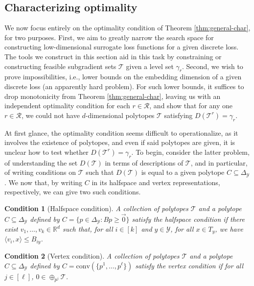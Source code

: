 \documentclass[anon]{colt2020} %
\newcommand{\reals}{\mathbb{R}}
\newcommand{\simplex}{\Delta_\Y}
\newcommand{\R}{\mathcal{R}}
\newcommand{\T}{\mathcal{T}}
\newcommand{\Y}{\mathcal{Y}}
\newcommand{\inprod}[2]{\langle #1, #2 \rangle}%
\newcommand{\conv}{\mathrm{conv}}
\newtheorem{condition}{Condition}
\begin{document}
\subsection{Characterizing optimality}\label{subsec:opt-conditions}

We now focus entirely on the optimality condition of Theorem \ref{thm:general-char}, for two purposes.
First, we aim to greatly narrow the search space for constructing low-dimensional surrogate loss functions for a given discrete loss.
The tools we construct in this section aid in this task by constraining or constructing feasible subgradient sets $\T$ given a level set $\gamma_r$.
Second, we wish to prove impossibilities, i.e., lower bounds on the embedding dimension of a given discrete loss (an apparently hard problem).
For such lower bounds, it suffices to drop monotonicity from Theorem \ref{thm:general-char}, leaving us with an independent optimality condition for each $r\in\R$, and show that for any one $r\in\R$, we could not have $d$-dimensional polytopes $\T$ satisfying $D(\T^r) = \gamma_r$.

At first glance, the optimality condition seems difficult to operationalize, as it involves the existence of polytopes, and even if said polytopes are given, it is unclear how to test whether $D(\T^r)=\gamma_r$.
To begin, consider the latter problem, of understanding the set $D(\T)$ in terms of descriptions of $\T$, and in particular, of writing conditions on $\T$ such that $D(\T)$ is equal to a given polytope $C\subseteq\simplex$.
We now that, by writing $C$ in its halfspace and vertex representations, respectively, we can give two such conditions.

\begin{condition}[Halfspace condition]\label{cond:H-condition}
	A collection of polytopes $\T$ and a polytope $C\subseteq\simplex$ defined by $C = \{p \in \simplex : Bp \geq \vec 0\}$ \emph{satisfy the halfspace condition} if there exist $v_1, \ldots, v_k \in \reals^d$ such that, for all $i \in [k]$ and $y \in \Y$, for all $x \in T_y$, we have $\inprod{v_i}{x} \leq B_{iy}$.
\end{condition}
\begin{condition}[Vertex condition]\label{cond:V-condition}
	A collection of polytopes $\T$ and a polytope $C\subseteq\simplex$ defined by $C = \conv(\{p^1, \ldots, p^\ell\})$ \emph{satisfy the vertex condition} if for all $j \in [\ell]$, $0 \in \oplus_{p^j} \T$. %
\end{condition}
\end{document}
